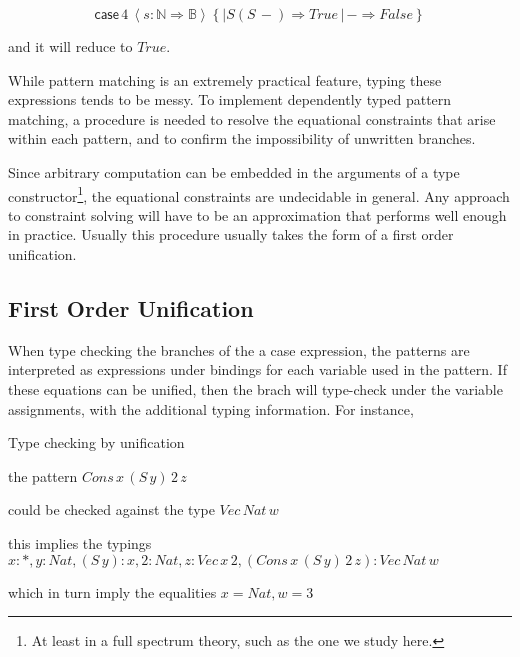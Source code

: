\[
\mathsf{case}\,4\,\left\langle s:\mathbb{N}\Rightarrow\mathbb{B}\right\rangle \left\{ |S\left(S\,-\right)\Rightarrow True\,|\,-\Rightarrow False\right\} 
\]

and it will reduce to $True$.

While pattern matching is an extremely practical feature, typing these
expressions tends to be messy. To implement dependently typed pattern
matching, a procedure is needed to resolve the equational constraints
that arise within each pattern, and to confirm the impossibility of
unwritten branches.

Since arbitrary computation can be embedded in the arguments of a
type constructor\footnote{At least in a full spectrum theory, such as the one we study here.},
the equational constraints are undecidable in general. Any approach
to constraint solving will have to be an approximation that performs
well enough in practice. Usually this procedure usually takes the
form of a first order unification. 




\subsection{First Order Unification}

When type checking the branches of the a case expression, the patterns
are interpreted as expressions under bindings for each variable used
in the pattern. If these equations can be unified, then the brach
will type-check under the variable assignments, with the additional
typing information. For instance,
\begin{example}
Type checking by unification

the pattern $Cons\,x\,\left(S\,y\right)\,2\,z$

could be checked against the type $Vec\,Nat\,w$

this implies the typings $x:*,y:Nat,\left(S\,y\right):x,2:Nat,z:Vec\,x\,2,\left(Cons\,x\,\left(S\,y\right)\,2\,z\right):Vec\,Nat\,w$

which in turn imply the equalities $x=Nat,w=3$
\end{example}


